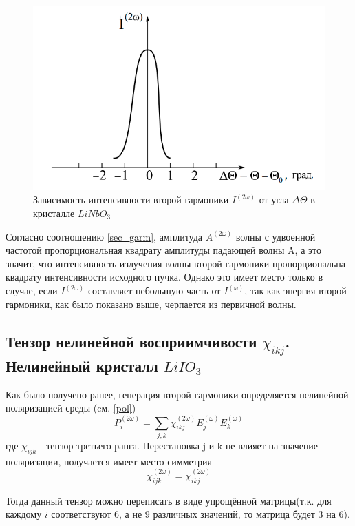 \documentclass[a4paper,12pt]{article} %
\begin{document}
\begin{figure}[H]
\centering
\includegraphics[scale=1]{pic4.png}
\caption{Зависимость интенсивности второй гармоники $I^{(2\omega)}$ от угла $\Delta \Theta$ в кристалле $LiNbO_3$}
\label{int}
\end{figure}

Согласно соотношению \eqref{sec_garm}, амплитуда $A^{(2\omega)}$ волны с удвоенной частотой пропорциональная квадрату амплитуды падающей волны A, а это значит, что интенсивность излучения волны второй гармоники пропорциональна квадрату интенсивности исходного пучка. Однако это имеет место только в случае, если $I^{(2\omega)}$ составляет небольшую часть от $I^{(\omega)}$, так как энергия второй гармоники, как было показано выше, черпается из первичной волны.
\subsection*{Тензор нелинейной восприимчивости $\chi_{ikj}$. \\Нелинейный кристалл $LiIO_3$}
Как было получено ранее, генерация второй гармоники определяется нелинейной поляризацией среды (cм. \eqref{pol})
\begin{equation}
P^{(2\omega)}_i = \sum_{j,k} \chi^{(2\omega)}_{ikj} E^{(\omega)}_j E^{(\omega)}_k
\label{2garm}
\end{equation}
где $\chi_{ijk}$ - тензор третьего ранга. Перестановка j и k не влияет на значение поляризации, получается имеет место симметрия
\begin{equation}
\chi^{(2\omega)}_{ijk} = \chi^{(2\omega)}_{ikj}
\end{equation}

Тогда данный тензор можно переписать в виде упрощённой матрицы(т.к. для каждому $i$ соответствуют 6, а не 9 различных значений, то матрица будет 3 на 6).
\end{document}
